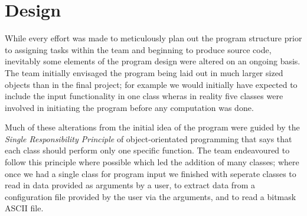 \section{Design}
\label{Design}
While every effort was made to meticulously plan out the program structure prior to assigning tasks within the team and beginning to produce source code, inevitably some elements of the program design were altered on an ongoing basis. The team initially envisaged the program being laid out in much larger sized objects than in the final project; for example we would initially have expected to include the input functionality in one class wheras in reality five classes were involved in initiating the program before any computation was done. 

Much of these alterations from the initial idea of the program were guided by the \textit{Single Responsibility Principle} of object-orientated programming that says that each class should perform only one specific function. The team endeavoured to follow this principle where possible which led the addition of many classes; where once we had a single class for program input we finished with seperate classes to read in data provided as arguments by a user, to extract data from a configuration file provided by the user via the arguments, and to read a bitmask ASCII file.

